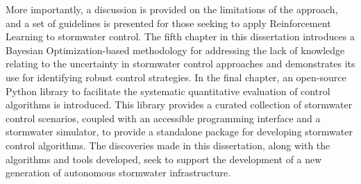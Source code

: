 More importantly, a discussion is provided on the limitations of the approach, and a set of guidelines is presented for those seeking to apply Reinforcement Learning to stormwater control.
The fifth chapter in this dissertation introduces a Bayesian Optimization-based methodology for addressing the lack of knowledge relating to the uncertainty in stormwater control approaches and demonstrates its use for identifying robust control strategies.
In the final chapter, an open-source Python library to facilitate the systematic quantitative evaluation of control algorithms is introduced.
This library provides a curated collection of stormwater control scenarios, coupled with an accessible programming interface and a stormwater simulator, to provide a standalone package for developing stormwater control algorithms.
The discoveries made in this dissertation, along with the algorithms and tools developed, seek to support the development of a new generation of autonomous stormwater infrastructure.
\endgroup

\vfill


